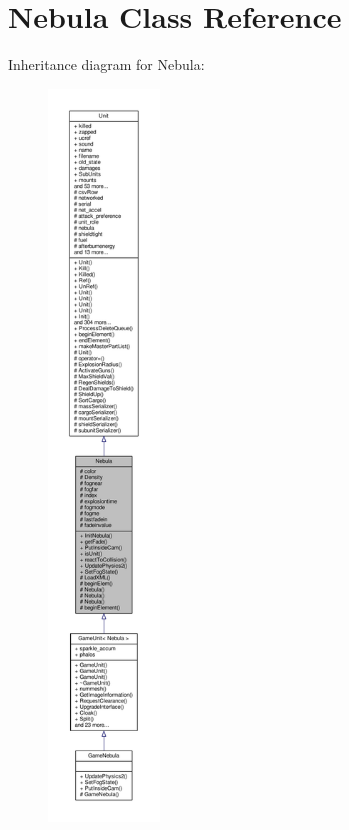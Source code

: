 \hypertarget{classNebula}{}\section{Nebula Class Reference}
\label{classNebula}


Inheritance diagram for Nebula\+:
\nopagebreak
\begin{figure}[H]
\begin{center}
\leavevmode
\includegraphics[height=550pt]{de/d76/classNebula__inherit__graph}
\end{center}
\end{figure}


